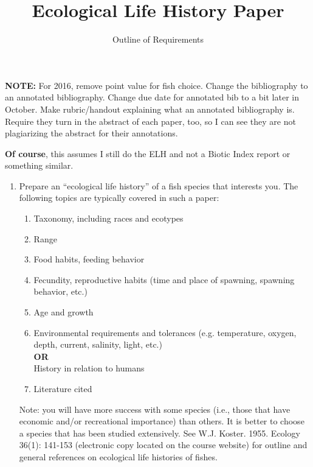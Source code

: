 \documentclass[11pt]{article}
\title{Ecological Life History Paper}
\author{Outline of Requirements}
\date{}                                           %
\begin{document}
\maketitle
\textbf{NOTE:} For 2016, remove point value for fish choice. Change the bibliography to an annotated bibliography. Change due date for annotated bib to a bit later in October. Make rubric/handout explaining what an annotated bibliography is.  Require they turn in the abstract of each paper, too, so I can see they are not plagiarizing the abstract for their annotations.

\textbf{Of course}, this assumes I still do the ELH and not a Biotic Index report or something similar.


\begin{enumerate}
	\item Prepare an “ecological life history” of a fish species that interests you. The following topics are typically covered in such a paper:

	\begin{enumerate}[label=\alph*.]
	\item	Taxonomy, including races and ecotypes
	\item Range
	\item Food habits, feeding behavior
	\item Fecundity, reproductive habits (time and place of spawning, spawning behavior, etc.)
	\item Age and growth
	\item Environmental requirements and tolerances (e.g. temperature, oxygen, depth, current, salinity, light, etc.)\\%
		\textbf{OR}\\%
		History in relation to humans
	\item Literature cited
	\end{enumerate}
	
	Note: you will have more success with some species (i.e., those that have economic and/or recreational importance) than others. It is better to choose a species that has been studied extensively. See W.J. Koster. 1955. Ecology 36(1): 141-153 (electronic copy located on the course website) for outline and general references on ecological life histories of fishes.
	

\end{enumerate}
\end{document}
